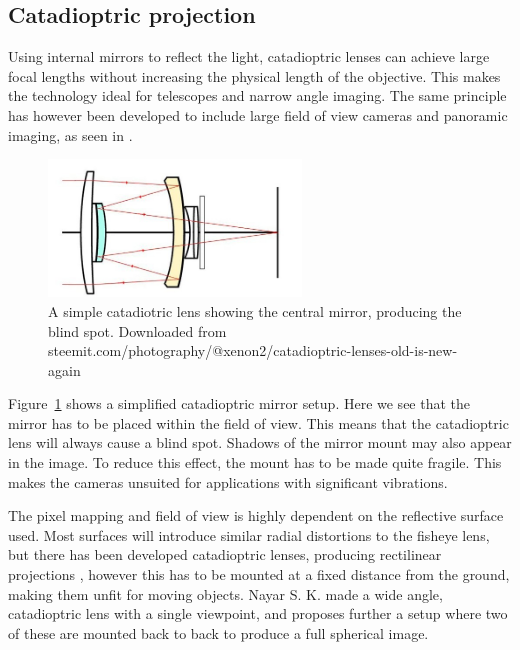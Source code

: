 \subsection{Catadioptric projection}

Using internal mirrors to reflect the light, catadioptric lenses can achieve large focal lengths without increasing the physical length of the objective. This makes the technology ideal for telescopes and narrow angle imaging. The same principle has however been developed to include large field of view cameras and panoramic imaging, as seen in \cite{CatadioptricOmni}. 

\begin{figure}[!htb]
    \centering
    \includegraphics[width=0.6\textwidth]{rapport/fig/Theory/cata.jpeg}
    \caption{A simple catadiotric lens showing the central mirror, producing the blind spot. Downloaded from steemit.com/photography/@xenon2/catadioptric-lenses-old-is-new-again}
    \label{fig:theory_catadioptric_lens}
\end{figure}

Figure~\ref{fig:theory_catadioptric_lens} shows a simplified catadioptric mirror setup. Here we see that the mirror has to be placed within the field of view. This means that the catadioptric lens will always cause a blind spot. Shadows of the mirror mount may also appear in the image. To reduce this effect, the mount has to be made quite fragile. This makes the cameras unsuited for applications with significant vibrations.

The pixel mapping and field of view is highly dependent on the reflective surface used. Most surfaces will introduce similar radial distortions to the fisheye lens, but there has been developed catadioptric lenses, producing rectilinear projections \cite{RectilinearCatadioptric}, however this has to be mounted at a fixed distance from the ground, making them unfit for moving objects. Nayar S. K. made a wide angle, catadioptric lens \cite{CatadioptricOmni} with a single viewpoint, and proposes further a setup where two of these are mounted back to back to produce a full spherical image.


